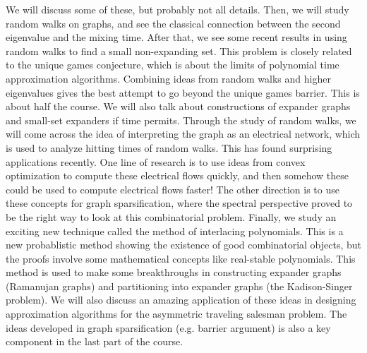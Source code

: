 \documentclass[11pt,a4paper]{report}
\theoremstyle{theoremdd}
\theoremstyle{claims1}
\theoremstyle{proofs1}
\begin{document}
\newline We will discuss some of these, but probably not all details.
\newline\newline Then, we will study random walks on graphs, and see the classical connection between the second eigenvalue and the mixing time.
\newline After that, we see some recent results in using random walks to find a small non-expanding set. This problem is closely related to the unique games conjecture, which is about the limits of polynomial time approximation algorithms. Combining ideas from random walks and higher eigenvalues gives the best attempt to go beyond the unique games barrier.
\newline This is about half the course. We will also talk about constructions of expander graphs and small-set expanders if time permits.
\newline\newline Through the study of random walks, we will come across the idea of interpreting the graph as an electrical network, which is used to analyze hitting times of random walks.
\newline This has found surprising applications recently.
\newline One line of research is to use ideas from convex optimization to compute these electrical flows quickly, and then somehow these could be used to compute electrical flows faster!
\newline The other direction is to use these concepts for graph sparsification, where the spectral perspective proved to be the right way to look at this combinatorial problem.
\newline\newline Finally, we study an exciting new technique called the method of interlacing polynomials. This is a new probablistic method showing the existence of good combinatorial objects, but the proofs involve some mathematical concepts like real-stable polynomials. This method is used to make some breakthroughs in constructing expander graphs (Ramanujan graphs) and partitioning into expander graphs (the Kadison-Singer problem).
\newline We will also discuss an amazing application of these ideas in designing approximation algorithms for the asymmetric traveling salesman problem.
\newline The ideas developed in graph sparsification (e.g. barrier argument) is also a key component in the last part of the course.
\end{document}
